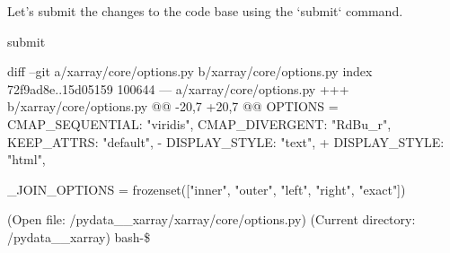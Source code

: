 {\begin{agentbox}
Let's submit the changes to the code base using the `submit` command.



\hrulefill
\begin{CodeVerbatim}[breaklines=true, breakanywhere=true]
submit
\end{CodeVerbatim}
\end{agentbox}
\begin{observationbox}\begin{CodeVerbatim}[breaklines=true, breakanywhere=true]

diff --git a/xarray/core/options.py b/xarray/core/options.py
index 72f9ad8e..15d05159 100644
--- a/xarray/core/options.py
+++ b/xarray/core/options.py
@@ -20,7 +20,7 @@ OPTIONS = {
     CMAP_SEQUENTIAL: "viridis",
     CMAP_DIVERGENT: "RdBu_r",
     KEEP_ATTRS: "default",
-    DISPLAY_STYLE: "text",
+    DISPLAY_STYLE: "html",
 }
 
 _JOIN_OPTIONS = frozenset(["inner", "outer", "left", "right", "exact"])

(Open file: /pydata__xarray/xarray/core/options.py)
(Current directory: /pydata__xarray)
bash-\$
\end{CodeVerbatim}
\end{observationbox}
}